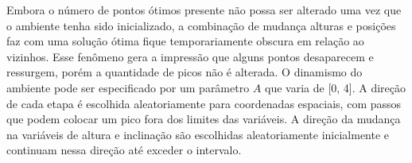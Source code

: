 Embora o número de pontos ótimos presente não possa ser alterado uma vez que o ambiente tenha sido inicializado, a combinação de mudança alturas e posições faz com uma solução ótima fique temporariamente obscura em relação ao vizinhos. Esse fenômeno gera a impressão que alguns pontos desaparecem e ressurgem, porém a quantidade de picos não é alterada. O dinamismo do ambiente pode ser especificado por um parâmetro $A$ que varia de [0, 4]. A direção de cada etapa é escolhida aleatoriamente para coordenadas espaciais, com passos que podem colocar um pico fora dos limites das variáveis. A direção da mudança na variáveis de altura e inclinação são escolhidas aleatoriamente inicialmente e continuam nessa direção até exceder o intervalo.
